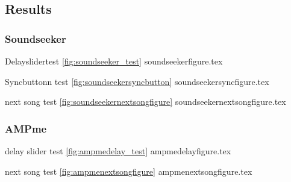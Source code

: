\subsection{Results}
\subsubsection{Soundseeker}
Delayslidertest \vref{fig:soundseeker_test}
{soundseekerfigure.tex}

Syncbuttonn test \vref{fig:soundseekersyncbutton}
{soundseekersyncfigure.tex}

next song test \vref{fig:soundseekernextsongfigure}
{soundseekernextsongfigure.tex}

\subsubsection{AMPme}
delay slider test \vref{fig:ampmedelay_test}
{ampmedelayfigure.tex}

next song test \vref{fig:ampmenextsongfigure}
{ampmenextsongfigure.tex}

